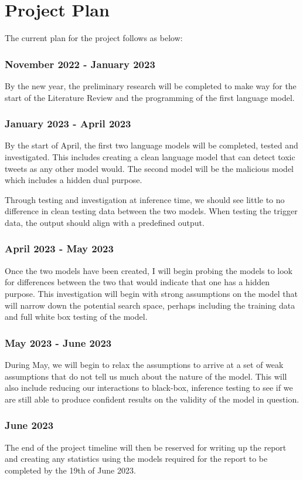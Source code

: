 \chapter{Project Plan}

The current plan for the project follows as below:

\subsection*{November 2022 - January 2023}
By the new year, the preliminary research will be completed to make way for the start of the Literature Review and the programming of the first language model.

\subsection*{January 2023 - April 2023}
By the start of April, the first two language models will be completed, tested and investigated. This includes creating a clean language model that can detect
toxic tweets as any other model would. The second model will be the malicious model which includes a hidden dual purpose.

Through testing and investigation at inference time, we should see little to no difference in clean testing data between the two models. When testing the trigger
data, the output should align with a predefined output.

\subsection*{April 2023 - May 2023}
Once the two models have been created, I will begin probing the models to look for differences between the two that would indicate that one has a hidden purpose. 
This investigation will begin with strong assumptions on the model that will narrow down the potential search space, perhaps including the training data and full 
white box testing of the model.

\subsection*{May 2023 - June 2023}
During May, we will begin to relax the assumptions to arrive at a set of weak assumptions that do not tell us much about the nature of the model. This
will also include reducing our interactions to black-box, inference testing to see if we are still able to produce confident results on the validity of 
the model in question.

\subsection*{June 2023}
The end of the project timeline will then be reserved for writing up the report and creating any statistics using the models required for the report to be completed by the 
19th of June 2023.
